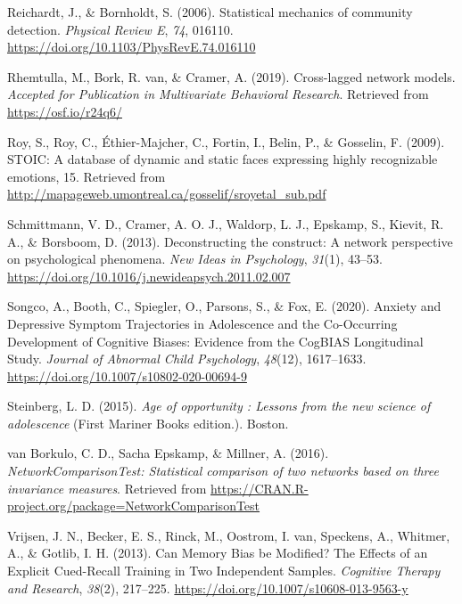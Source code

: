 \documentclass[
  english,
  man,floatsintext]{apa6}
\begin{document}
\leavevmode\hypertarget{ref-reichardt_statistical_2006}{}%
Reichardt, J., \& Bornholdt, S. (2006). Statistical mechanics of community detection. \emph{Physical Review E}, \emph{74}, 016110. \url{https://doi.org/10.1103/PhysRevE.74.016110}

\leavevmode\hypertarget{ref-rhemtulla_cross-lagged_2019}{}%
Rhemtulla, M., Bork, R. van, \& Cramer, A. (2019). Cross-lagged network models. \emph{Accepted for Publication in Multivariate Behavioral Research}. Retrieved from \url{https://osf.io/r24q6/}

\leavevmode\hypertarget{ref-roy_stoic:_2009}{}%
Roy, S., Roy, C., Éthier-Majcher, C., Fortin, I., Belin, P., \& Gosselin, F. (2009). STOIC: A database of dynamic and static faces expressing highly recognizable emotions, 15. Retrieved from \url{http://mapageweb.umontreal.ca/gosselif/sroyetal_sub.pdf}

\leavevmode\hypertarget{ref-schmittmann_deconstructing_2013}{}%
Schmittmann, V. D., Cramer, A. O. J., Waldorp, L. J., Epskamp, S., Kievit, R. A., \& Borsboom, D. (2013). Deconstructing the construct: A network perspective on psychological phenomena. \emph{New Ideas in Psychology}, \emph{31}(1), 43--53. \url{https://doi.org/10.1016/j.newideapsych.2011.02.007}

\leavevmode\hypertarget{ref-songco_anxiety_2020}{}%
Songco, A., Booth, C., Spiegler, O., Parsons, S., \& Fox, E. (2020). Anxiety and Depressive Symptom Trajectories in Adolescence and the Co-Occurring Development of Cognitive Biases: Evidence from the CogBIAS Longitudinal Study. \emph{Journal of Abnormal Child Psychology}, \emph{48}(12), 1617--1633. \url{https://doi.org/10.1007/s10802-020-00694-9}

\leavevmode\hypertarget{ref-steinberg_age_2015}{}%
Steinberg, L. D. (2015). \emph{Age of opportunity : Lessons from the new science of adolescence} (First Mariner Books edition.). Boston.

\leavevmode\hypertarget{ref-R-NetworkComparisonTest}{}%
van Borkulo, C. D., Sacha Epskamp, \& Millner, A. (2016). \emph{NetworkComparisonTest: Statistical comparison of two networks based on three invariance measures}. Retrieved from \url{https://CRAN.R-project.org/package=NetworkComparisonTest}

\leavevmode\hypertarget{ref-Vrijsen2013}{}%
Vrijsen, J. N., Becker, E. S., Rinck, M., Oostrom, I. van, Speckens, A., Whitmer, A., \& Gotlib, I. H. (2013). Can Memory Bias be Modified? The Effects of an Explicit Cued-Recall Training in Two Independent Samples. \emph{Cognitive Therapy and Research}, \emph{38}(2), 217--225. \url{https://doi.org/10.1007/s10608-013-9563-y}
\end{document}
